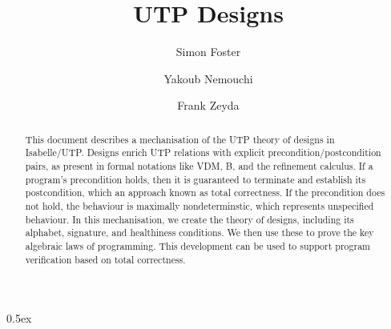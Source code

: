 \documentclass[11pt,a4paper]{article}
\begin{document}
\title{UTP Designs}

\author{Simon Foster \and Yakoub Nemouchi \and Frank Zeyda}

\maketitle

\begin{abstract}
  This document describes a mechanisation of the UTP theory of designs in Isabelle/UTP. Designs enrich UTP relations
  with explicit precondition/postcondition pairs, as present in formal notations like VDM, B, and the refinement
  calculus. If a program's precondition holds, then it is guaranteed to terminate and establish its postcondition, which
  an approach known as total correctness. If the precondition does not hold, the behaviour is maximally nondeterminstic,
  which represents unspecified behaviour. In this mechanisation, we create the theory of designs, including its
  alphabet, signature, and healthiness conditions. We then use these to prove the key algebraic laws of
  programming. This development can be used to support program verification based on total correctness.
\end{abstract}

\tableofcontents

\parindent 0pt\parskip 0.5ex





\end{document}
